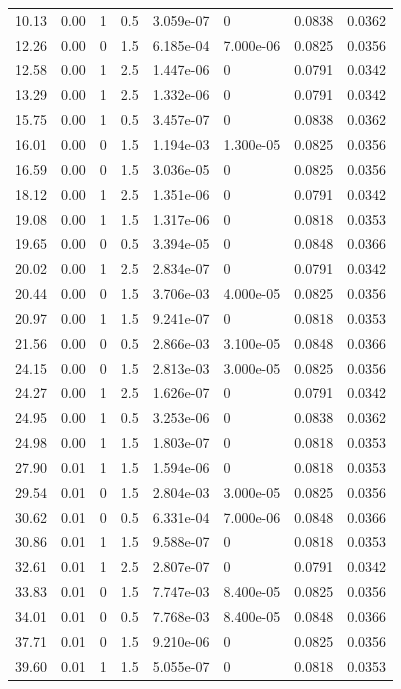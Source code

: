 \documentclass[preview]{standalone}
\begin{document}
{{\begin{tabular}{L{1.2cm}C{1.2cm} C{0.3cm}C{0.5cm} C{1.4cm}C{1.4cm} C{1.4cm}C{1.4cm}}
  10.13  &  0.00  & 1     & 0.5 &  3.059e-07  & 0  & 0.0838 &  0.0362   \\ 
  12.26  &  0.00  & 0     & 1.5 &  6.185e-04  & 7.000e-06  & 0.0825 &  0.0356   \\ 
  12.58  &  0.00  & 1     & 2.5 &  1.447e-06  & 0  & 0.0791 &  0.0342   \\ 
  13.29  &  0.00  & 1     & 2.5 &  1.332e-06  & 0  & 0.0791 &  0.0342   \\ 
  15.75  &  0.00  & 1     & 0.5 &  3.457e-07  & 0  & 0.0838 &  0.0362   \\ 
  16.01  &  0.00  & 0     & 1.5 &  1.194e-03  & 1.300e-05  & 0.0825 &  0.0356   \\ 
  16.59  &  0.00  & 0     & 1.5 &  3.036e-05  & 0  & 0.0825 &  0.0356   \\ 
  18.12  &  0.00  & 1     & 2.5 &  1.351e-06  & 0  & 0.0791 &  0.0342   \\ 
  19.08  &  0.00  & 1     & 1.5 &  1.317e-06  & 0  & 0.0818 &  0.0353   \\ 
  19.65  &  0.00  & 0     & 0.5 &  3.394e-05  & 0  & 0.0848 &  0.0366   \\ 
  20.02  &  0.00  & 1     & 2.5 &  2.834e-07  & 0  & 0.0791 &  0.0342   \\ 
  20.44  &  0.00  & 0     & 1.5 &  3.706e-03  & 4.000e-05  & 0.0825 &  0.0356   \\ 
  20.97  &  0.00  & 1     & 1.5 &  9.241e-07  & 0  & 0.0818 &  0.0353   \\ 
  21.56  &  0.00  & 0     & 0.5 &  2.866e-03  & 3.100e-05  & 0.0848 &  0.0366   \\ 
  24.15  &  0.00  & 0     & 1.5 &  2.813e-03  & 3.000e-05  & 0.0825 &  0.0356   \\ 
  24.27  &  0.00  & 1     & 2.5 &  1.626e-07  & 0  & 0.0791 &  0.0342   \\ 
  24.95  &  0.00  & 1     & 0.5 &  3.253e-06  & 0  & 0.0838 &  0.0362   \\ 
  24.98  &  0.00  & 1     & 1.5 &  1.803e-07  & 0  & 0.0818 &  0.0353   \\ 
  27.90  &  0.01  & 1     & 1.5 &  1.594e-06  & 0  & 0.0818 &  0.0353   \\ 
  29.54  &  0.01  & 0     & 1.5 &  2.804e-03  & 3.000e-05  & 0.0825 &  0.0356   \\ 
  30.62  &  0.01  & 0     & 0.5 &  6.331e-04  & 7.000e-06  & 0.0848 &  0.0366   \\ 
  30.86  &  0.01  & 1     & 1.5 &  9.588e-07  & 0  & 0.0818 &  0.0353   \\ 
  32.61  &  0.01  & 1     & 2.5 &  2.807e-07  & 0  & 0.0791 &  0.0342   \\ 
  33.83  &  0.01  & 0     & 1.5 &  7.747e-03  & 8.400e-05  & 0.0825 &  0.0356   \\ 
  34.01  &  0.01  & 0     & 0.5 &  7.768e-03  & 8.400e-05  & 0.0848 &  0.0366   \\ 
  37.71  &  0.01  & 0     & 1.5 &  9.210e-06  & 0  & 0.0825 &  0.0356   \\ 
  39.60  &  0.01  & 1     & 1.5 &  5.055e-07  & 0  & 0.0818 &  0.0353   \\ 
\hline 
\end{tabular} 

}}
\end{document}
